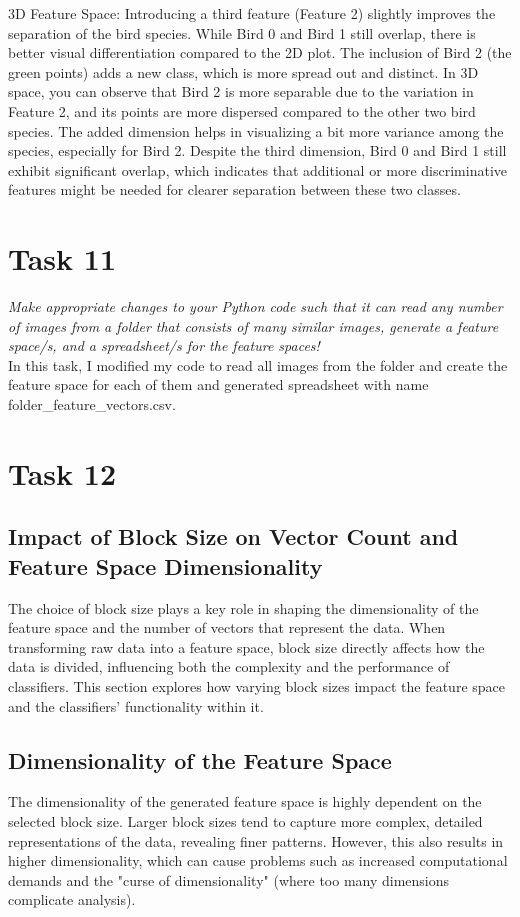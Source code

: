 \documentclass[conference,12pt]{IEEEtran}
\begin{document}
3D Feature Space: Introducing a third feature (Feature 2) slightly improves the separation of the bird species. While Bird 0 and Bird 1 still overlap, there is better visual differentiation compared to the 2D plot. The inclusion of Bird 2 (the green points) adds a new class, which is more spread out and distinct.
In 3D space, you can observe that Bird 2 is more separable due to the variation in Feature 2, and its points are more dispersed compared to the other two bird species. The added dimension helps in visualizing a bit more variance among the species, especially for Bird 2.
Despite the third dimension, Bird 0 and Bird 1 still exhibit significant overlap, which indicates that additional or more discriminative features might be needed for clearer separation between these two classes.

\section{Task 11}
\textit{Make appropriate changes to your Python code such that it can read any number of images from a folder that consists of many similar images, generate a feature space/s, and a spreadsheet/s for the feature spaces!}\\
In this task, I modified my code to read all images from the folder and create the feature space for each of them and generated spreadsheet with name folder\_feature\_vectors.csv.

\section{Task 12}
\subsection{Impact of Block Size on Vector Count and Feature Space Dimensionality}
The choice of block size plays a key role in shaping the dimensionality of the feature space and the number of vectors that represent the data. When transforming raw data into a feature space, block size directly affects how the data is divided, influencing both the complexity and the performance of classifiers. This section explores how varying block sizes impact the feature space and the classifiers' functionality within it.

\subsection{ Dimensionality of the Feature Space}
The dimensionality of the generated feature space is highly dependent on the selected block size. Larger block sizes tend to capture more complex, detailed representations of the data, revealing finer patterns. However, this also results in higher dimensionality, which can cause problems such as increased computational demands and the "curse of dimensionality" (where too many dimensions complicate analysis).
\end{document}
